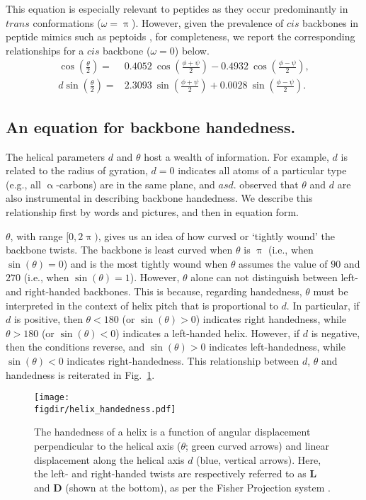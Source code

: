 \documentclass[fleqn,10pt]{wlpeerj} %
\newcommand{\Fig}[1]{Fig.~\ref{#1}}
\newcommand{\figdir}{./figures}
\begin{document}
This equation is especially relevant to peptides as they occur predominantly in $trans$ conformations ($\omega=\uppi$). However, given the prevalence of $cis$ backbones in peptide mimics such as peptoids \citep{Mirijanian2014,Gorske2016}, for completeness, we report the corresponding relationships for a $cis$ backbone ($\omega=0$) below.
\begin{align}
\label{eqn:theta_cis}
\cos\left(\frac{\theta}{2}\right) =& 0.4052~\cos\left(\frac{\phi+\psi}{2}\right)
                                    -0.4932~\cos\left(\frac{\phi-\psi}{2}\right), \\
\label{eqn:theta_d}
d \sin\left(\frac{\theta}{2}\right) = & 2.3093~\sin\left(\frac{\phi+\psi}{2}\right)
                                       +0.0028~\sin\left(\frac{\phi-\psi}{2}\right).
\end{align}

\subsection*{An equation for backbone handedness.} 
The helical parameters $d$ and $\theta$ host a wealth of information. For example, $d$ is related to the radius of gyration, $d=0$ indicates all atoms of a particular type (e.g., all $\upalpha$-carbons) are in the same plane, and $asd$. \cite{Zacharias2013} observed that $\theta$ and $d$ are also instrumental in describing backbone handedness. We describe this relationship first by words and pictures, and then in equation form. 

$\theta$, with range $[0,2\uppi)$, gives us an idea of how curved or `tightly wound' the backbone twists. The backbone is least curved when $\theta$ is $\uppi$ (i.e., when $\sin(\theta) = 0$) and is the most tightly wound when $\theta$ assumes the value of  $90$ and $270$ (i.e., when $\sin(\theta) = 1$). However, $\theta$ alone can not distinguish between left- and right-handed backbones. This is because, regarding handedness, $\theta$ must be interpreted in the context of helix pitch that is proportional to $d$. In particular, if $d$ is positive, then $\theta < 180$ (or $\sin(\theta)>0$) indicates right handedness, while $\theta > 180$ (or $\sin(\theta)<0$) indicates a left-handed helix. However, if $d$ is negative, then the conditions reverse, and $\sin(\theta)>0$ indicates left-handedness, while $\sin(\theta)<0$ indicates right-handedness. This relationship between $d$, $\theta$ and  handedness is reiterated in \Fig{fig:helix_handedness}.

\begin{figure}[t!]
\centering
\texttt{[image: \\figdir/helix\_handedness.pdf]}
\caption{\label{fig:helix_handedness} The handedness of a helix is a function of angular displacement perpendicular to the helical axis ($\theta$; green curved arrows) and linear displacement along the helical axis $d$ (blue, vertical arrows). Here, the left- and right-handed twists are respectively referred to as $\textbf{L}$ and $\textbf{D}$ (shown at the bottom), as per the Fisher Projection system \citep{Cross2013}.}
\end{figure}
\end{document}
